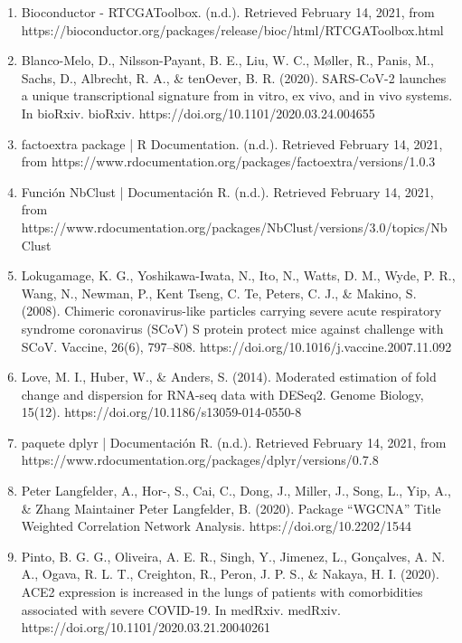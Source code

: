 \documentclass{bmcart}
\begin{document}
\begin{backmatter}
\begin{enumerate}
			\item Bioconductor - RTCGAToolbox. (n.d.). Retrieved February 14, 2021, from https://bioconductor.org/packages/release/bioc/html/RTCGAToolbox.html
			
			\item Blanco-Melo, D., Nilsson-Payant, B. E., Liu, W. C., Møller, R., Panis, M., Sachs, D., Albrecht, R. A., \& tenOever, B. R. (2020). SARS-CoV-2 launches a unique transcriptional signature from in vitro, ex vivo, and in vivo systems. In bioRxiv. bioRxiv. https://doi.org/10.1101/2020.03.24.004655
			
			\item factoextra package | R Documentation. (n.d.). Retrieved February 14, 2021, from https://www.rdocumentation.org/packages/factoextra/versions/1.0.3
			
			\item Función NbClust | Documentación R. (n.d.). Retrieved February 14, 2021, from https://www.rdocumentation.org/packages/NbClust/versions/3.0/topics/NbClust
			
			\item Lokugamage, K. G., Yoshikawa-Iwata, N., Ito, N., Watts, D. M., Wyde, P. R., Wang, N., Newman, P., Kent Tseng, C. Te, Peters, C. J., \& Makino, S. (2008). Chimeric coronavirus-like particles carrying severe acute respiratory syndrome coronavirus (SCoV) S protein protect mice against challenge with SCoV. Vaccine, 26(6), 797–808. https://doi.org/10.1016/j.vaccine.2007.11.092
			
			\item Love, M. I., Huber, W., \& Anders, S. (2014). Moderated estimation of fold change and dispersion for RNA-seq data with DESeq2. Genome Biology, 15(12). https://doi.org/10.1186/s13059-014-0550-8
			
			\item paquete dplyr | Documentación R. (n.d.). Retrieved February 14, 2021, from https://www.rdocumentation.org/packages/dplyr/versions/0.7.8
			
			\item Peter Langfelder, A., Hor-, S., Cai, C., Dong, J., Miller, J., Song, L., Yip, A., \& Zhang Maintainer Peter Langfelder, B. (2020). Package “WGCNA” Title Weighted Correlation Network Analysis. https://doi.org/10.2202/1544
			
			\item Pinto, B. G. G., Oliveira, A. E. R., Singh, Y., Jimenez, L., Gonçalves, A. N. A., Ogava, R. L. T., Creighton, R., Peron, J. P. S., \& Nakaya, H. I. (2020). ACE2 expression is increased in the lungs of patients with comorbidities associated with severe COVID-19. In medRxiv. medRxiv. https://doi.org/10.1101/2020.03.21.20040261
			

\end{enumerate}
\end{backmatter}
\end{document}
